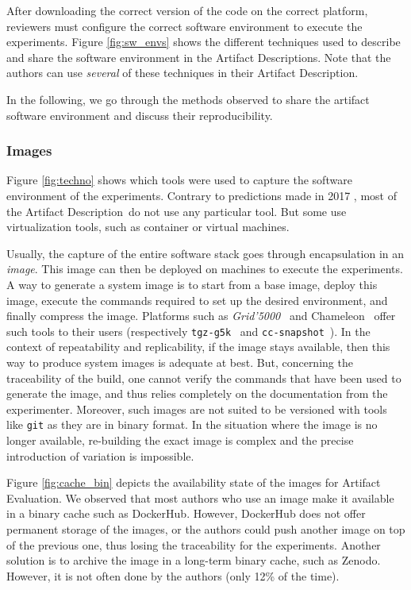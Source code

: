 \documentclass[sigconf,natbib=false]{acmart}
\newcommand{\grid}{\emph{Grid'5000}}
\newcommand{\ad}{Artifact Description}
\newcommand{\aeval}{Artifact Evaluation}
\begin{document}
After downloading the correct version of the code on the correct platform, reviewers must configure the correct software environment to execute the experiments.
Figure \ref{fig:sw_envs} shows the different techniques used to describe and share the software environment in the \ad s.
Note that the authors can use \emph{several} of these techniques in their \ad.

In the following, we go through the methods observed to share the artifact software environment and discuss their reproducibility.

\subsubsection{Images}\label{sec:sop:sw:images}

Figure \ref{fig:techno} shows which tools were used to capture the software environment of the experiments.
Contrary to predictions made in 2017 \cite{silver2017software}, most of the \ad\ do not use any particular tool.
But some use virtualization tools, such as container or virtual machines.

Usually, the capture of the entire software stack goes through encapsulation in an \emph{image}.
This image can then be deployed on machines to execute the experiments.
A way to generate a system image is to start from a base image, deploy this image, execute the commands required to set up the desired environment, and finally compress the image.
Platforms such as \grid\ \cite{grid5000} and Chameleon\ \cite{chameleon} offer such tools to their users (respectively \texttt{tgz-g5k}\ \cite{tgz-g5k} and \texttt{cc-snapshot}\ \cite{cc-snapshot}).
In the context of repeatability and replicability, if the image stays available, then this way to produce system images is adequate at best.
But, concerning the traceability of the build, one cannot verify the commands that have been used to generate the image, and thus relies completely on the documentation from the experimenter.
Moreover, such images are not suited to be versioned with tools like \texttt{git} as they are in binary format.
In the situation where the image is no longer available, re-building the exact image is complex and the precise introduction of variation is impossible.

Figure \ref{fig:cache_bin} depicts the availability state of the images for \aeval.
We observed that most authors who use an image make it available in a binary cache such as DockerHub. 
However, DockerHub does not offer permanent storage of the images, or the authors could push another image on top of the previous one, thus losing the traceability for the experiments.
Another solution is to archive the image in a long-term binary cache, such as Zenodo.
However, it is not often done by the authors (only 12\% of the time).
\end{document}
